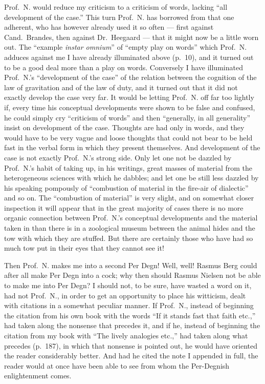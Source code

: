 \documentclass[12pt,a4paper]{book}
\begin{document}
Prof.\ N. would reduce my criticism to a criticism of words, lacking ``all
development of the case.'' This turn Prof.\ N. has borrowed from that one
adherent, who has however already used it so often --- first against Cand.\
Brandes, then against Dr.\ Heegaard --- that it might now be a little worn out.
The ``example \textit{instar omnium}'' of
``empty play on words'' which Prof.\ N. adduces against me I have already
illuminated above (p.\ 10), and it turned out to be a good deal more than a play
on words. Conversely I have illuminated Prof.\ N.'s ``development of the case''
of the relation between the cognition of
the law of gravitation and of the law of duty, and it turned out that it did not
exactly develop the case very far. It would be letting Prof.\ N. off far too
lightly if, every time his conceptual developments were shown to be false and
confused, he could simply cry ``criticism of words'' and then ``generally, in
all generality'' insist on development of the case. Thoughts are had only in
words, and they would have to be very vague and loose thoughts that could not
bear to be held fast in the verbal form in which they present themselves. And
development of the case is not exactly Prof.\ N.'s strong side. Only let one not
be dazzled by Prof.\ N.'s
habit of taking up, in his writings, great masses of material from the
heterogeneous sciences with which he dabbles; and let one be still less dazzled
by his speaking pompously of ``combustion of material in the fire-air of
dialectic'' and so on. The ``combustion of material'' is very slight, and on
somewhat closer inspection it will appear that in the great majority of cases
there is no more organic connection between Prof.\ N.'s conceptual developments
and the material taken in than there is in a zoological museum between the
animal hides and the tow with which they are stuffed. But there are certainly
those who have had so much tow put in their eyes that they cannot see it!

Then Prof.\ N. makes me into a second Per Degn! Well, well! Rasmus Berg could
after all make Per Degn into a cock; why then should Rasmus Nielsen not be able
to make me into Per Degn? I should not, to be sure, have wasted a word on it, had
not Prof.\ N., in order to get an opportunity to place his witticism, dealt with
citations in a somewhat peculiar manner. If Prof.\ N., instead of beginning the
citation from his own book with the words ``If it stands fast that faith etc.,''
had taken along the nonsense that precedes it, and if he, instead of beginning
the citation from my book with ``The lively analogies etc.,'' had taken along
what precedes (p.\ 187), in which that nonsense is pointed out, he would have
oriented the reader considerably better. And had he cited the note I appended in
full, the reader would at once have been able to see from whom the Per-Degnish
enlightenment comes.
\end{document}
